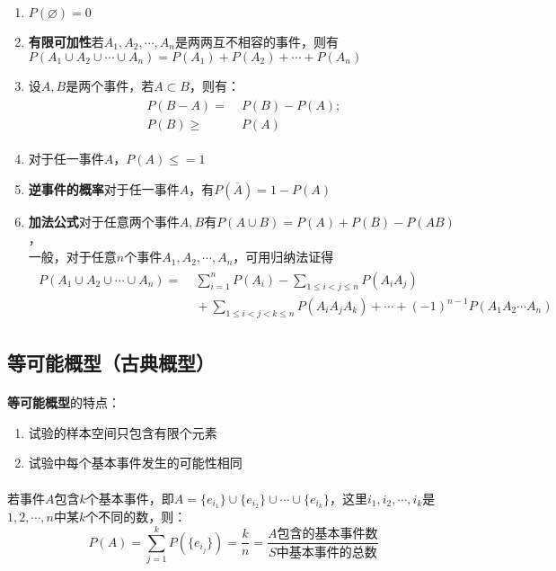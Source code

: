 \begin{enumerate}
  \item $P(\varnothing) = 0$
  \item \textbf{有限可加性\;}若$A_1, A_2, \cdots, A_n$是两两互不相容的事件，则有$ P(A_1 \cup A_2 \cup \cdots \cup A_n)=P(A_1)+P(A_2)+\cdots+P(A_n)$
  \item 设$A, B$是两个事件，若$A \subset B$，则有：
  \begin{align}
    \begin{split}
    P(B-A) =&\; P(B) - P(A); \\
    P(B) \geq &\; P(A)
    \end{split}
  \end{align}
  \item 对于任一事件$A$，$P(A) \leq = 1$
  \item \textbf{逆事件的概率\;}对于任一事件$A$，有$P(\overline{A}) = 1-P(A)$
  \item \textbf{加法公式\;}对于任意两个事件$A, B$有$P(A \cup B)=P(A)+P(B)-P(AB)$，\\ 一般，对于任意$n$个事件$A_1, A_2, \cdots , A_n$，可用归纳法证得
  \begin{align}
    \begin{split}
    P(A_1 \cup A_2 \cup \cdots \cup A_n) =& \; \sum_{i=1}^{n}P(A_i) - \sum_{1 \leq i < j \leq n}P(A_iA_j) \\
    & \; + \sum_{1 \leq i < j < k \leq n}P(A_iA_jA_k)+ \cdots + (-1)^{n-1}P(A_1A_2 \cdots A_n)
    \end{split}
  \end{align}
\end{enumerate}

\subsection{等可能概型（古典概型）}
\paragraph{}
\textbf{等可能概型\;}的特点：
\begin{enumerate}
  \item 试验的样本空间只包含有限个元素
  \item 试验中每个基本事件发生的可能性相同
\end{enumerate}
\paragraph{}
若事件$A$包含$k$个基本事件，即$A = \{e_{i_1}\} \cup \{e_{i_2}\} \cup \cdots \cup \{e_{i_k}\}$，这里$i_1, i_2, \cdots, i_k$是$1, 2, \cdots, n$中某$k$个不同的数，则：
\begin{equation}
  P(A) = \sum_{j=1}^{k}P(\{e_{i_j}\}) = \frac{k}{n} = \frac{\text{$A$包含的基本事件数}}{\text{$S$中基本事件的总数}}
\end{equation}


